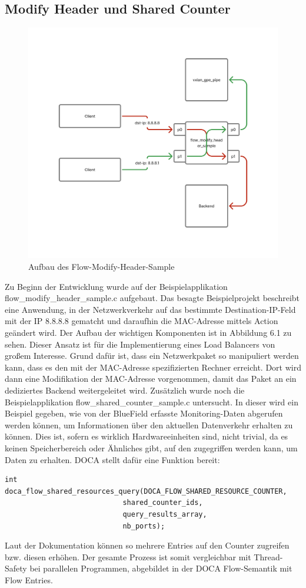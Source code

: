 \subsection{Modify Header und Shared Counter}
\begin{figure}
    \centering
    \includegraphics[width=0.8\linewidth]{images/modify_header.png}
    \caption{Aufbau des Flow-Modify-Header-Sample}
    \label{fig:enter-label}
\end{figure}
Zu Beginn der Entwicklung wurde auf der Beispielapplikation flow\_modify\_header\_sample.c aufgebaut. Das besagte Beispielprojekt beschreibt eine Anwendung, in der Netzwerkverkehr auf das bestimmte Destination-IP-Feld mit der IP 8.8.8.8 gematcht und daraufhin die MAC-Adresse mittels Action geändert wird. Der Aufbau der wichtigen Komponenten ist in Abbildung 6.1 zu sehen. Dieser Ansatz ist für die Implementierung eines Load Balancers von großem Interesse. Grund dafür ist, dass ein Netzwerkpaket so manipuliert werden kann, dass es den mit der MAC-Adresse spezifizierten Rechner erreicht. Dort wird dann eine Modifikation der MAC-Adresse vorgenommen, damit das Paket an ein dediziertes Backend weitergeleitet wird. Zusätzlich wurde noch die Beispielapplikation flow\_shared\_counter\_sample.c untersucht. In dieser wird ein Beispiel gegeben, wie von der BlueField erfasste Monitoring-Daten abgerufen werden können, um Informationen über den aktuellen Datenverkehr erhalten zu können. Dies ist, sofern es wirklich Hardwareeinheiten sind, nicht trivial, da es keinen Speicherbereich oder Ähnliches gibt, auf den zugegriffen werden kann, um Daten zu erhalten. DOCA stellt dafür eine Funktion bereit:
\begin{verbatim}
int doca_flow_shared_resources_query(DOCA_FLOW_SHARED_RESOURCE_COUNTER,
							shared_counter_ids,
							query_results_array,
							nb_ports);
\end{verbatim}
 Laut der Dokumentation können so mehrere Entries auf den Counter zugreifen bzw. diesen erhöhen. Der gesamte Prozess ist somit vergleichbar mit Thread-Safety bei parallelen Programmen, abgebildet in der DOCA Flow-Semantik mit Flow Entries.

